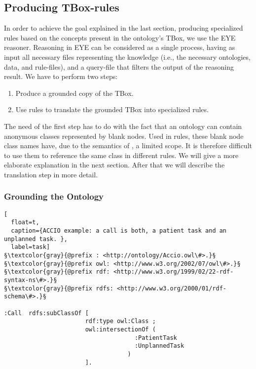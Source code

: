 \subsection{Producing TBox-rules}\label{reasoning}
In order to achieve the goal explained in the last section, producing specialized rules based on the concepts present in the ontology's TBox, 
we use the EYE reasoner.
Reasoning in EYE can be considered as a single  process, having as input all necessary files representing the knowledge 
(i.e., the necessary ontologies, data, and rule-files), and a query-file that filters the output of the reasoning result.
We have to perform two steps:
\begin{enumerate}
 \item Produce a grounded copy of the  TBox. 
 \item Use rules to translate the grounded TBox into specialized rules.
\end{enumerate}

The need of the first step has to do with the fact that an ontology can contain anonymous classes represented by blank nodes. Used in rules, 
these blank node class names have, due to the semantics of \nthree, a 
limited scope. It is therefore difficult to use them to reference the same class in different rules. 
We will give a more elaborate explanation in the next section. 
After that we will describe the translation step in more detail.



\subsubsection{Grounding the Ontology}
\begin{lstlisting}[
  float=t,
  caption={ACCIO example: a call is both, a patient task and an unplanned task. },
  label=task]
§\textcolor{gray}{@prefix : <http://ontology/Accio.owl\#>.}§
§\textcolor{gray}{@prefix owl: <http://www.w3.org/2002/07/owl\#>.}§
§\textcolor{gray}{@prefix rdf: <http://www.w3.org/1999/02/22-rdf-syntax-ns\#>.}§
§\textcolor{gray}{@prefix rdfs: <http://www.w3.org/2000/01/rdf-schema\#>.}§

:Call  rdfs:subClassOf [ 
                       rdf:type owl:Class ;
                       owl:intersectionOf ( 
                                     :PatientTask
                                     :UnplannedTask
                                   )
                       ].
\end{lstlisting}


